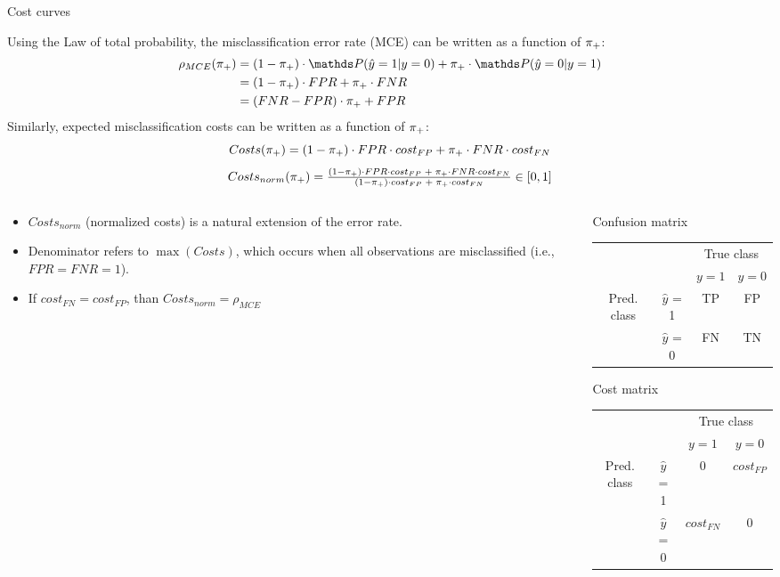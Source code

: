\begin{vbframe}{Cost curves}
\small

Using the Law of total probability, the misclassification error rate (MCE) can be written as a function of $\pi_{+}$:
\begin{align*}
\rho_{MCE}(\rp)
&= (1 - \rp) \cdot \P(\hat y = 1 | y = 0) + \rp \cdot \P(\hat y = 0 | y = 1) \\
&= (1 - \rp) \cdot FPR + \rp \cdot FNR \\
&= (FNR - FPR) \cdot \rp + FPR
\end{align*}
Similarly, expected misclassification costs can be written as a function of $\pi_{+}$:
$$Costs(\pi_{+}) = (1 - \pi_{+}) \cdot FPR \cdot cost_{FP} + \pi_{+} \cdot FNR \cdot cost_{FN}$$
$$Costs_{norm}(\pi_{+}) = \tfrac{(1 - \pi_{+}) \cdot FPR \cdot cost_{FP} \; + \; \pi_{+} \cdot FNR \cdot cost_{FN}}{(1 - \pi_{+}) \cdot cost_{FP} \; + \; \pi_{+} \cdot cost_{FN}} \in [0,1]$$

\begin{columns}[T]
\begin{column}{0.64\textwidth}
\small
\begin{itemize}
\itemsep0em
\item $Costs_{norm}$ (normalized costs) is a natural extension of the error rate.
\item Denominator refers to $\max(Costs)$, which occurs when all observations are misclassified (i.e., $FPR = FNR = 1$).
\item If $cost_{FN} = cost_{FP}$, than $Costs_{norm} = \rho_{MCE}$
\end{itemize}
\end{column}
\begin{column}{0.34\textwidth}
\tiny

\centerline{Confusion matrix}
\begin{tabular}{cc|cc}
    & &\multicolumn{2}{c}{True class} \\
    & & $y=1$ & $y=0$  \\
 \hline
    \multirow{2}{*}{\parbox{0.3cm}{Pred.  class}}& $\hat y$ = 1     & TP                 & FP\\
    & $\hat y$ = 0 & FN              & TN\\
\end{tabular}

\lz

\centerline{Cost matrix}
\begin{tabular}{cc|cc}
    & &\multicolumn{2}{c}{True class} \\
    & & $y=1$ & $y=0$  \\
 \hline
    \multirow{2}{*}{\parbox{0.3cm}{Pred.  class}}& $\hat y$ = 1     & 0                 & $cost_{FP}$\\
    & $\hat y$ = 0 & $cost_{FN}$              & 0\\
\end{tabular}


\end{column}
\end{columns}
\end{vbframe}
